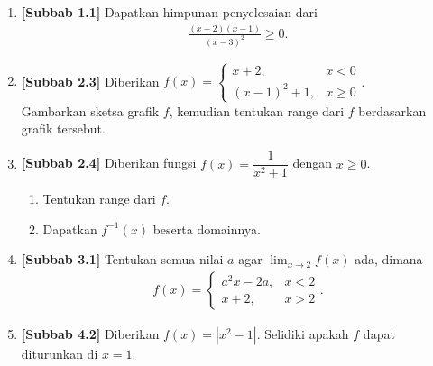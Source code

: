 \documentclass[10pt,openany,a4paper]{article}
\theoremstyle{definition}
\theoremstyle{definition}
\theoremstyle{plain}
\begin{document}
\begin{enumerate}
    \item \textbf{[Subbab 1.1]} Dapatkan himpunan penyelesaian dari
    \begin{align*}
        \frac{(x+2)(x-1)}{(x-3)^2}\geq 0.
    \end{align*}

    \item \textbf{[Subbab 2.3]} Diberikan $f(x)=\begin{cases}
        x+2, & x<0\\
        (x-1)^2+1, & x\geq 0
    \end{cases}$.\\
    Gambarkan sketsa grafik $f$, kemudian tentukan range dari $f$ berdasarkan grafik tersebut.

    \item \textbf{[Subbab 2.4]} Diberikan fungsi $f(x)=\dfrac{1}{x^2+1}$ dengan $x\geq 0$.
    \begin{enumerate}
        \item Tentukan range dari $f$.
        \item Dapatkan $f^{-1}(x)$ beserta domainnya.
    \end{enumerate}

    \item \textbf{[Subbab 3.1]} Tentukan semua nilai $a$ agar $\displaystyle\lim_{x\to 2}f(x)$ ada, dimana
    \begin{align*}
        f(x)=\begin{cases}
            a^2x-2a, & x<2\\
            x+2, & x>2
        \end{cases}.
    \end{align*}

    \item \textbf{[Subbab 4.2]} Diberikan $f(x)=\left|x^2-1\right|$. Selidiki apakah $f$ dapat diturunkan di $x=1$.
\end{enumerate}

\newpage
\end{document}
